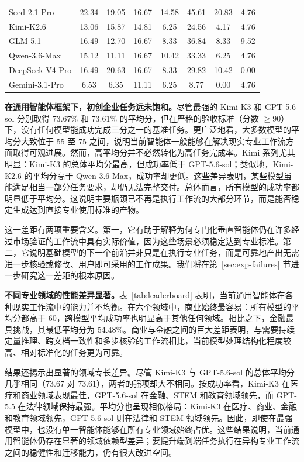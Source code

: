 \begin{table}[t]
{\begin{tabular}{lccccccc}
    Seed-2.1-Pro    & 22.34 & 19.05 & 16.67 & 14.58 & \underline{45.61} & 20.83 & 4.76 \\
    Kimi-K2.6       & 13.06 & 15.87 & 14.81 & 6.25 & 24.56 & 4.17 & 4.76 \\
    GLM-5.1         & 16.49 & 12.70 & 16.67 & 8.33 & 36.84 & 8.33 & 9.52 \\
    Qwen-3.6-Max    & 15.12 & 11.11 & 16.67 & 10.42 & 33.33 & 6.25 & 4.76 \\
    DeepSeek-V4-Pro & 16.49 & 20.63 & 16.67 & 8.33 & 29.82 & 10.42 & 0.00 \\
    Gemini-3.1-Pro  & 6.53 & 6.35 & 11.11 & 6.25 & 8.77 & 0.00 & 4.76 \\
    \bottomrule
  \end{tabular}}
\end{table}

\textbf{在通用智能体框架下，初创企业任务远未饱和。}尽管最强的 Kimi-K3 和 GPT-5.6-sol 分别取得 73.67\% 和 73.61\% 的平均分，但在严格的验收标准（分数 $\ge 90$）下，没有任何模型能成功完成三分之一的基准任务。更广泛地看，大多数模型的平均分大致位于 55 至 75 之间，说明当前智能体一般能够在解决现实专业工作流方面取得可观进展。然而，高平均分并不必然转化为高任务完成率。Kimi 系列尤其明显：Kimi-K3 的总体平均分最高，但成功率低于 GPT-5.6-sol；类似地，Kimi-K2.6 的平均分高于 Qwen-3.6-Max，成功率却更低。这些差异表明，某些模型虽能满足相当一部分任务要求，却仍无法完整交付。总体而言，所有模型的成功率都明显低于平均分。这说明主要瓶颈已不再是执行工作流的大部分环节，而是能否稳定生成达到直接专业使用标准的产物。

这一差距有两项重要含义。第一，它有助于解释为何专门化垂直智能体仍在许多经过市场验证的工作流中具有实际价值，因为这些场景必须稳定达到专业标准。第二，它说明基础模型的下一个前沿并非只是在执行专业任务，而是可靠地产出无需进一步核验或修改、用户即可采用的工作成果。我们将在第~\ref{sec:exp-failures} 节进一步研究这一差距的根本原因。

\textbf{不同专业领域的性能差异显著。}表~\ref{tab:leaderboard} 表明，当前通用智能体在各种现实工作流中的能力并不均衡。在六个领域中，商业始终最容易：所有模型的平均分都高于 60，跨模型平均成功率也明显高于其他任何领域。相比之下，金融最具挑战，其最低平均分为 54.48\%。商业与金融之间的巨大差距表明，与需要持续定量推理、跨文档一致性和多步核验的工作流相比，当前模型处理结构化程度较高、相对标准化的任务更为可靠。

结果还揭示出显著的领域专长差异。尽管 Kimi-K3 与 GPT-5.6-sol 的总体平均分几乎相同（73.67 对 73.61），两者的强项却大不相同。按成功率看，Kimi-K3 在医疗和商业领域表现最佳，GPT-5.6-sol 在金融、STEM 和教育领域领先，而 GPT-5.5 在法律领域保持最强。平均分也呈现相似格局：Kimi-K3 在医疗、商业、金融和教育领域领先，GPT-5.6-sol 则在法律和 STEM 领域领先。因此，即使在最强模型中，也没有单一智能体能够在所有专业领域始终占优。这些结果说明，当前通用智能体仍存在显著的领域依赖型差异；要提升端到端任务执行在异构专业工作流之间的稳健性和迁移能力，仍有很大改进空间。

